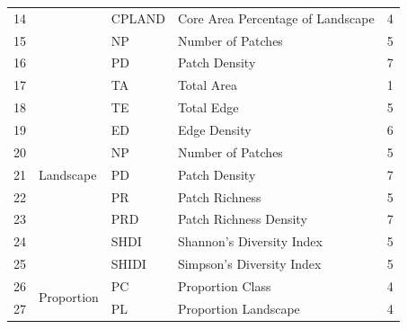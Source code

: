 \begin{table}[]
\begin{tabular}{@{}lllll@{}}
14          &                             & CPLAND           & Core Area Percentage of Landscape    & 4                 \\
15          &                             & NP               & Number of Patches                    & 5                 \\
16          &                             & PD               & Patch Density                        & 7                 \\ \midrule
17          & \multirow{9}{*}{Landscape}  & TA               & Total Area                           & 1                 \\
18          &                             & TE               & Total Edge                           & 5                 \\
19          &                             & ED               & Edge Density                         & 6                 \\
20          &                             & NP               & Number of Patches                    & 5                 \\
21          &                             & PD               & Patch Density                        & 7                 \\
22          &                             & PR               & Patch Richness                       & 5                 \\
23          &                             & PRD              & Patch Richness Density               & 7                 \\
24          &                             & SHDI             & Shannon's Diversity Index            & 5                 \\
25          &                             & SHIDI            & Simpson's Diversity Index            & 5                 \\ \midrule
26          & \multirow{2}{*}{Proportion} & PC               & Proportion Class                     & 4                 \\
27          &                             & PL               & Proportion Landscape                 & 4                 \\ \bottomrule
\end{tabular}
\end{table}

